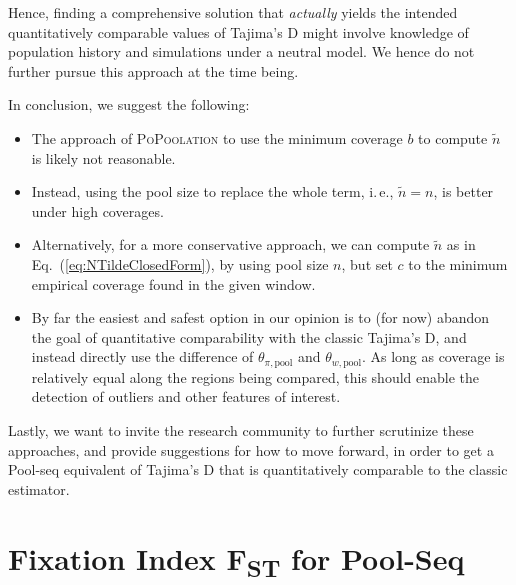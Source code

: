 \documentclass[letterpaper,fontsize=9pt,DIV=12]{scrartcl}
\newcommand\toolname{\textsc}
\newcommand\eqnref[1]{Eq.~(\ref{#1})}
\newcommand{\fst}{F\textsubscript{ST}}
\begin{document}
Hence, finding a comprehensive solution that \emph{actually} yields the intended quantitatively comparable values of Tajima's D might involve knowledge of population history and simulations under a neutral model. We hence do not further pursue this approach at the time being.

In conclusion, we suggest the following: 

\begin{itemize}
    \item The approach of \toolname{PoPoolation} to use the minimum coverage $b$ to compute $\tilde{n}$ is likely not reasonable.
    \item Instead, using the pool size to replace the whole term, i.\,e., $\tilde{n} = n$, is better under high coverages.
    \item Alternatively, for a more conservative approach, we can compute $\tilde{n}$ as in \eqnref{eq:NTildeClosedForm}, by using pool size $n$, but set $c$ to the minimum empirical coverage found in the given window.
    \item By far the easiest and safest option in our opinion is to (for now) abandon the goal of quantitative comparability with the classic Tajima's D, and instead directly use the difference of $\theta_{\pi,\text{pool}}$ and $\theta_{w, \text{pool}}$.  As long as coverage is relatively equal along the regions being compared, this should enable the detection of outliers and other features of interest.
\end{itemize}

Lastly, we want to invite the research community to further scrutinize these approaches, and provide suggestions for how to move forward, in order to get a Pool-seq equivalent of Tajima's D that is quantitatively comparable to the classic estimator.


\section{Fixation Index \texorpdfstring{\fst}{FST} for Pool-Seq}
\label{supp:sec:FST}
\end{document}
